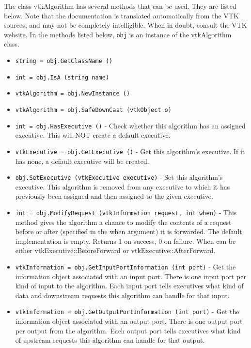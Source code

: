 The class vtkAlgorithm has several methods that can be used.
  They are listed below.
Note that the documentation is translated automatically from the VTK sources,
and may not be completely intelligible.  When in doubt, consult the VTK website.
In the methods listed below, \verb|obj| is an instance of the vtkAlgorithm class.
\begin{itemize}
\item  \verb|string = obj.GetClassName ()|

\item  \verb|int = obj.IsA (string name)|

\item  \verb|vtkAlgorithm = obj.NewInstance ()|

\item  \verb|vtkAlgorithm = obj.SafeDownCast (vtkObject o)|

\item  \verb|int = obj.HasExecutive ()| -  Check whether this algorithm has an assigned executive.  This
 will NOT create a default executive.

\item  \verb|vtkExecutive = obj.GetExecutive ()| -  Get this algorithm's executive.  If it has none, a default
 executive will be created.

\item  \verb|obj.SetExecutive (vtkExecutive executive)| -  Set this algorithm's executive.  This algorithm is removed from
 any executive to which it has previously been assigned and then
 assigned to the given executive.

\item  \verb|int = obj.ModifyRequest (vtkInformation request, int when)| -  This method gives the algorithm a chance to modify the contents of a
 request before or after (specified in the when argument) it is
 forwarded. The default implementation is empty. Returns 1 on success,
 0 on failure. When can be either vtkExecutive::BeforeForward or
 vtkExecutive::AfterForward.

\item  \verb|vtkInformation = obj.GetInputPortInformation (int port)| -  Get the information object associated with an input port.  There
 is one input port per kind of input to the algorithm.  Each input
 port tells executives what kind of data and downstream requests
 this algorithm can handle for that input.

\item  \verb|vtkInformation = obj.GetOutputPortInformation (int port)| -  Get the information object associated with an output port.  There
 is one output port per output from the algorithm.  Each output
 port tells executives what kind of upstream requests this
 algorithm can handle for that output.


\end{itemize}
